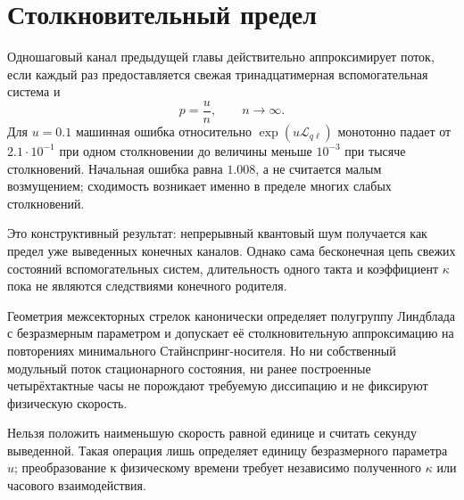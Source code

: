 \section{Столкновительный предел}

Одношаговый канал предыдущей главы действительно аппроксимирует поток,
если каждый раз предоставляется свежая тринадцатимерная вспомогательная система и
\begin{equation}
 p=\frac{u}{n},\qquad n\longrightarrow\infty.
 \label{eq:v8-fresh-ancilla-scaling}
\end{equation}
Для $u=0.1$ машинная ошибка относительно
$\exp(u\mathcal L_{q\ell})$ монотонно падает от $2.1\cdot10^{-1}$ при
одном столкновении до величины меньше $10^{-3}$ при тысяче столкновений.
Начальная ошибка равна $1.008$, а не считается малым возмущением; сходимость
возникает именно в пределе многих слабых столкновений.

Это конструктивный результат: непрерывный квантовый шум получается как
предел уже выведенных конечных каналов. Однако сама бесконечная цепь свежих
состояний вспомогательных систем, длительность одного такта и коэффициент $\kappa$ пока
не являются следствиями конечного родителя.

\begin{theorem}
Геометрия межсекторных стрелок канонически определяет полугруппу Линдблада с
безразмерным параметром и допускает её столкновительную аппроксимацию на
повторениях минимального Стайнспринг-носителя. Но ни собственный модульный
поток стационарного состояния, ни ранее построенные четырёхтактные часы не
порождают требуемую диссипацию и не фиксируют физическую скорость.
\end{theorem}

\begin{nogocriterion}
Нельзя положить наименьшую скорость равной единице и считать секунду
выведенной. Такая операция лишь определяет единицу безразмерного параметра
$u$; преобразование к физическому времени требует независимо полученного
$\kappa$ или часового взаимодействия.
\end{nogocriterion}

